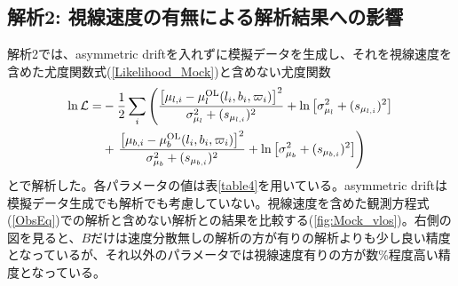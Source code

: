 
\subsection{解析2: 視線速度の有無による解析結果への影響}
解析2では、asymmetric driftを入れずに模擬データを生成し、それを視線速度を含めた尤度関数式(\ref{Likelihood_Mock})と含めない尤度関数
\begin{align}
\begin{aligned}
	\ln \mathcal{L} =& -\frac{1}{2}\sum_i \left(\frac{\left[\mu_{l,i} - \mu_l^{\mathrm{OL}}(l_i,b_i,\varpi_i)\right]^2}{\sigma_{\mu_l}^2 + (s_{\mu_{l,i}})^2}  + {\rm ln}\left[\sigma_{\mu_l}^2 + (s_{\mu_{l,i}})^2\right] \right. \\
	&+ \left. \frac{\left[\mu_{b,i} - \mu_b^{\mathrm{OL}}(l_i,b_i,\varpi_i)\right]^2}{\sigma_{\mu_b}^2 + (s_{\mu_{b,i}})^2}  + {\rm ln}\left[\sigma_{\mu_b}^2 + (s_{\mu_{b,i}})^2\right] \right)
\end{aligned}
\end{align}
とで解析した。各パラメータの値は表\ref{table4}を用いている。asymmetric driftは模擬データ生成でも解析でも考慮していない。視線速度を含めた観測方程式(\ref{ObsEq})での解析と含めない解析との結果を比較する(\ref{fig:Mock_vlos})。右側の図を見ると、$B$だけは速度分散無しの解析の方が有りの解析よりも少し良い精度となっているが、それ以外のパラメータでは視線速度有りの方が数\%程度高い精度となっている。

